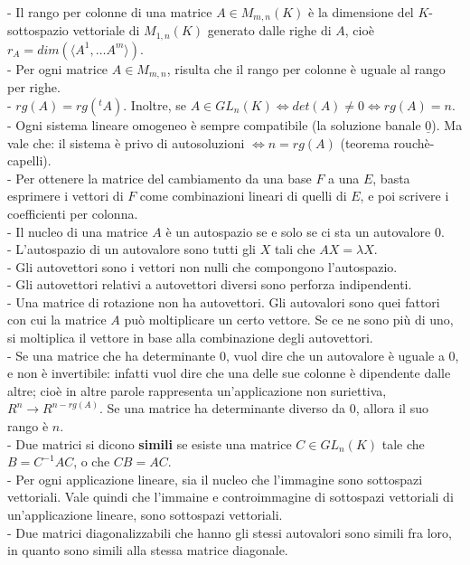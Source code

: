 \documentclass[a4paper,10pt]{article} %
\renewcommand{\b}[1]{%
    {\textbf{#1}}}
\renewcommand{\v}[1]{%
    {\underline{#1}}}
\begin{document}
- Il rango per colonne di una matrice $A \in M_{m,n}(K)$ è la dimensione del $K$-sottospazio vettoriale di $M_{1,n}(K)$ generato dalle righe di $A$, cioè $r_A = dim(\langle A^1, \ldots A^m \rangle)$.\\
- Per ogni matrice $A \in M_{m,n}$, risulta che il rango per colonne è uguale al rango per righe.\\
- $rg(A) = rg(^tA)$. Inoltre, se $A \in GL_n(K) \Leftrightarrow det(A) \neq 0 \Leftrightarrow rg(A) = n$.\\
- Ogni sistema lineare omogeneo è sempre compatibile (la soluzione banale $\v{0}$). Ma vale che: il sistema è privo di autosoluzioni $\Leftrightarrow n = rg(A)$ (teorema rouchè-capelli).\\
- Per ottenere la matrice del cambiamento da una base $F$ a una $E$, basta esprimere i vettori di $F$ come combinazioni lineari di quelli di $E$, e poi scrivere i coefficienti per colonna.\\
- Il nucleo di una matrice $A$ è un autospazio se e solo se ci sta un autovalore $0$.\\
- L'autospazio di un autovalore sono tutti gli $X$ tali che $AX = \lambda X$.\\
- Gli autovettori sono i vettori non nulli che compongono l'autospazio.\\
- Gli autovettori relativi a autovettori diversi sono perforza indipendenti.\\
- Una matrice di rotazione non ha autovettori. Gli autovalori sono quei fattori con cui la matrice $A$ può moltiplicare un certo vettore. Se ce ne sono più di uno, si moltiplica il vettore in base alla combinazione degli autovettori.\\
- Se una matrice che ha determinante $0$, vuol dire che un autovalore è uguale a $0$, e non è invertibile: infatti vuol dire che una delle sue colonne è dipendente dalle altre; cioè in altre parole rappresenta un'applicazione non suriettiva, $R^n \rightarrow R^{n - rg(A)}$. Se una matrice ha determinante diverso da $0$, allora il suo rango è $n$.\\
- Due matrici si dicono \b{simili} se esiste una matrice $C \in GL_n(K)$ tale che $B = C^{-1}AC$, o che $CB = AC$.\\
- Per ogni applicazione lineare, sia il nucleo che l'immagine sono sottospazi vettoriali. Vale quindi che l'immaine e controimmagine di sottospazi vettoriali di un'applicazione lineare, sono sottospazi vettoriali.\\
- Due matrici diagonalizzabili che hanno gli stessi autovalori sono simili fra loro, in quanto sono simili alla stessa matrice diagonale.\\
\end{document}
